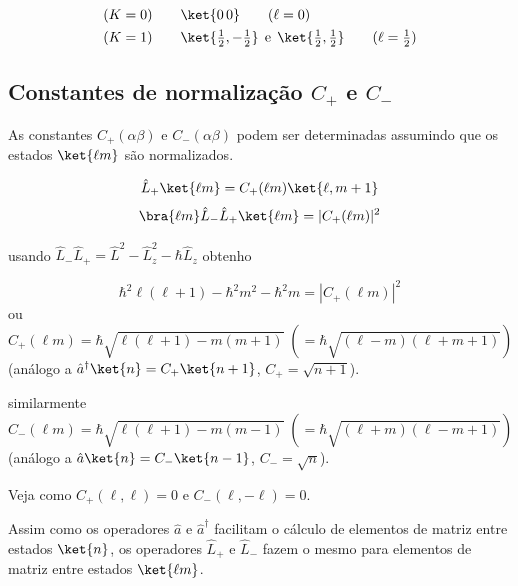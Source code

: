 \begin{align}
    (K=0) &\qquad \ket{0\,0} \qquad (\ell = 0) \notag \\
    (K=1) &\qquad \ket{\tfrac{1}{2}, -\tfrac{1}{2}} \;\, \text{e} \;\, \ket{\tfrac{1}{2}, \tfrac{1}{2}} \qquad (\ell = \tfrac{1}{2}) \notag
\end{align}

\subsection*{Constantes de normalização $C_+$ e $C_-$}

As constantes $C_+(\alpha\beta)$ e $C_-(\alpha\beta)$ podem ser determinadas assumindo que os estados $\ket{\ell m}$ são normalizados.

\begin{equation}
    \hat{L}_+ \ket{\ell m} = C_+(\ell m) \ket{\ell, m+1}
\label{eq:aula20_Lplus_lm}
\end{equation}
\begin{equation}
    \bra{\ell m} \hat{L}_- \hat{L}_+ \ket{\ell m} = |C_+(\ell m)|^2
\label{eq:aula20_norma_Cmais}
\end{equation}

usando $\hat{L}_- \hat{L}_+ = \hat{L}^2 - \hat{L}_z^2 - \hbar \hat{L}_z$ obtenho

\begin{equation}
    \hbar^2 \ell(\ell+1) - \hbar^2 m^2 - \hbar^2 m = |C_+(\ell m)|^2
\label{eq:aula20_Cmais_eq}
\end{equation}
ou
\begin{equation}
    C_+(\ell m) = \hbar \sqrt{\ell(\ell+1) - m(m+1)} \; \left( = \hbar\sqrt{(\ell-m)(\ell+m+1)} \right)
\label{eq:aula20_Cmais_final}
\end{equation}
(análogo a $\hat{a}^\dagger \ket{n} = C_+ \ket{n+1}$, $C_+ = \sqrt{n+1}$).

similarmente
\begin{equation}
    C_-(\ell m) = \hbar \sqrt{\ell(\ell+1) - m(m-1)} \; \left( = \hbar\sqrt{(\ell+m)(\ell-m+1)} \right)
\label{eq:aula20_Cmenos_final}
\end{equation}
(análogo a $\hat{a}\ket{n} = C_- \ket{n-1}$, $C_- = \sqrt{n}$).

Veja como $C_+(\ell,\ell) = 0$ e $C_-(\ell,-\ell) = 0$.

Assim como os operadores $\hat{a}$ e $\hat{a}^\dagger$ facilitam o cálculo de elementos de matriz entre estados $\ket{n}$, os operadores $\hat{L}_+$ e $\hat{L}_-$ fazem o mesmo para elementos de matriz entre estados $\ket{\ell m}$.

